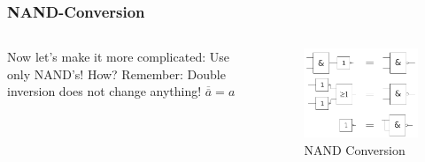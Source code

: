 \documentclass{beamer}
\begin{document}
\begin{frame}  \frametitle{NAND-Conversion}
  \begin{columns}
  \begin{column}{5cm}
  Now let's make it more complicated: 
  \newline Use only NAND's! How?
  \newline\newline
  \pause Remember: Double inversion does not change anything! \newline $\overline{\overline{a}}=a$
  \end{column}
  
  \begin{column}{6cm}
    \begin{figure}[H]
      \centering
      \includegraphics[width=1\textwidth]{nand_conversion}%
      \caption{NAND Conversion}%
      \label{fig:nand_conversion}
    \end{figure}
  \end{column}
  \end{columns}  
\end{frame}
\end{document}
